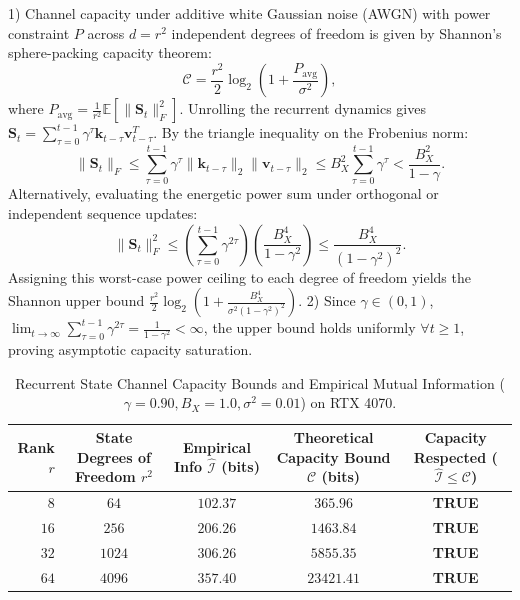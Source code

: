 \documentclass[journal]{IEEEtran}
\begin{document}
\begin{IEEEproof}
1) Channel capacity under additive white Gaussian noise (AWGN) with power constraint $P$ across $d = r^2$ independent degrees of freedom is given by Shannon's sphere-packing capacity theorem:
\begin{equation}
\mathcal{C} = \frac{r^2}{2} \log_2\left( 1 + \frac{P_{\text{avg}}}{\sigma^2} \right),
\end{equation}
where $P_{\text{avg}} = \frac{1}{r^2} \mathbb{E}[\|\mathbf{S}_t\|_F^2]$.
Unrolling the recurrent dynamics gives $\mathbf{S}_t = \sum_{\tau=0}^{t-1} \gamma^\tau \mathbf{k}_{t-\tau} \mathbf{v}_{t-\tau}^T$.
By the triangle inequality on the Frobenius norm:
\begin{equation}
\|\mathbf{S}_t\|_F \le \sum_{\tau=0}^{t-1} \gamma^\tau \|\mathbf{k}_{t-\tau}\|_2 \|\mathbf{v}_{t-\tau}\|_2 \le B_X^2 \sum_{\tau=0}^{t-1} \gamma^\tau < \frac{B_X^2}{1 - \gamma}.
\end{equation}
Alternatively, evaluating the energetic power sum under orthogonal or independent sequence updates:
\begin{equation}
\|\mathbf{S}_t\|_F^2 \le \left( \sum_{\tau=0}^{t-1} \gamma^{2\tau} \right) \left( \frac{B_X^4}{1 - \gamma^2} \right) \le \frac{B_X^4}{(1 - \gamma^2)^2}.
\end{equation}
Assigning this worst-case power ceiling to each degree of freedom yields the Shannon upper bound $\frac{r^2}{2} \log_2\left( 1 + \frac{B_X^4}{\sigma^2 (1 - \gamma^2)^2} \right)$.
2) Since $\gamma \in (0, 1)$, $\lim_{t \to \infty} \sum_{\tau=0}^{t-1} \gamma^{2\tau} = \frac{1}{1 - \gamma^2} < \infty$, the upper bound holds uniformly $\forall t \ge 1$, proving asymptotic capacity saturation.
\end{IEEEproof}

\begin{table}[h]
\centering
\caption{Recurrent State Channel Capacity Bounds and Empirical Mutual Information ($\gamma=0.90, B_X=1.0, \sigma^2=0.01$) on RTX 4070.}
\label{tab:information_capacity}
\begin{tabular}{rcccc}
\toprule
\textbf{Rank} $r$ & \textbf{State Degrees of Freedom} $r^2$ & \textbf{Empirical Info} $\hat{\mathcal{I}}$ (bits) & \textbf{Theoretical Capacity Bound} $\mathcal{C}$ (bits) & \textbf{Capacity Respected ($\hat{\mathcal{I}} \le \mathcal{C}$)} \\
\midrule
$8$  & $64$   & $102.37$ & $365.96$   & \textbf{TRUE} \\
$16$ & $256$  & $206.26$ & $1463.84$  & \textbf{TRUE} \\
$32$ & $1024$ & $306.26$ & $5855.35$  & \textbf{TRUE} \\
$64$ & $4096$ & $357.40$ & $23421.41$ & \textbf{TRUE} \\
\bottomrule
\end{tabular}
\end{table}
\end{document}
